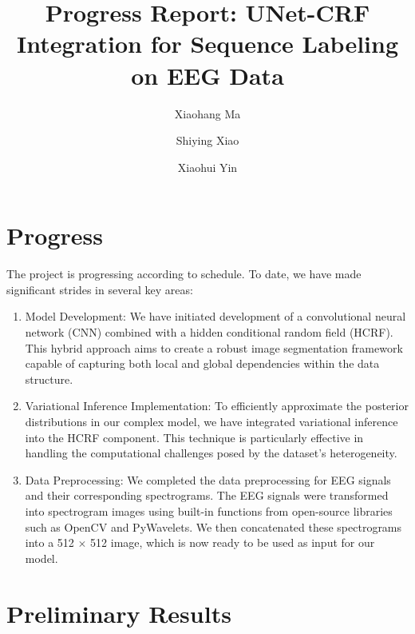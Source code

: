 \documentclass[10pt]{article}
\begin{document}
\title{\vspace{-1cm}
Progress Report: UNet-CRF Integration for Sequence Labeling on EEG Data}

\author[1]{Xiaohang Ma}
\author[2]{Shiying Xiao}
\author[2]{Xiaohui Yin}


\date{\vspace{-1.3cm}}

\maketitle


\section{Progress}


The project is progressing according to schedule. To date, we have made
significant strides in several key areas:
\begin{enumerate}
\item Model Development:
We have initiated development of a convolutional neural network (CNN) combined
with a hidden conditional random field (HCRF). This hybrid approach aims to
create a robust image segmentation framework capable of capturing both local
and global dependencies within the data structure.
\item Variational Inference Implementation:
To efficiently approximate the posterior distributions in our complex model,
we have integrated variational inference into the HCRF component.
This technique is particularly effective in handling the computational
challenges posed by the dataset's heterogeneity.
\item Data Preprocessing:
We completed the data preprocessing for EEG signals and their corresponding
spectrograms. The EEG signals were transformed into spectrogram images using
built-in functions from open-source libraries such as OpenCV and PyWavelets.
We then concatenated these spectrograms into a 512 $\times$ 512 image,
which is now ready to be used as input for our model.
\end{enumerate}


\section{Preliminary Results}
\end{document}
